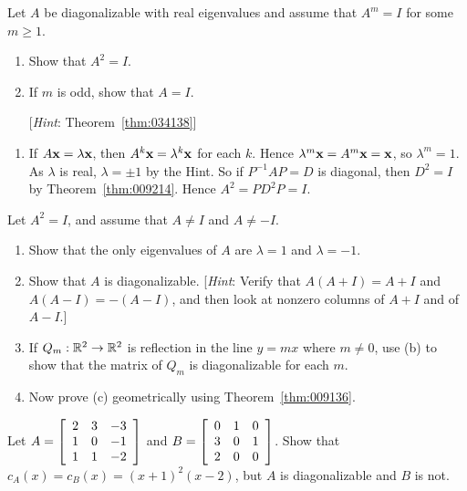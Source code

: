 \begin{multicols}{2}
\begin{ex}
Let $A$ be diagonalizable with real eigenvalues and assume that $A^{m} = I$ for some $m \geq 1$.


\begin{enumerate}[label={\alph*.}]
\item Show that $A^{2} = I$.

\item If $m$ is odd, show that $A = I$.


[\textit{Hint}: Theorem~\ref{thm:034138}]

\end{enumerate}
\begin{sol}
\begin{enumerate}[label={\alph*.}]
\item  If $A\textbf{x} = \lambda\textbf{x}$, then $A^{k}\textbf{x} = \lambda^{k}\textbf{x}$ for each $k$. Hence $\lambda^{m}\textbf{x} = A^{m}\textbf{x} = \textbf{x}$, so $\lambda^{m} = 1$. As $\lambda$ is real, $\lambda = \pm 1$ by the Hint. So if $P^{-1}AP = D$ is diagonal, then $D^{2} = I$ by Theorem~\ref{thm:009214}. Hence $A^{2} = PD^{2}P = I$.

\end{enumerate}
\end{sol}
\end{ex}

\columnbreak
\begin{ex}
Let $A^{2} = I$, and assume that $A \neq I$ and $A \neq -I$.


\begin{enumerate}[label={\alph*.}]
\item Show that the only eigenvalues of $A$ are $\lambda = 1$ and $\lambda = -1$.

\item Show that $A$ is diagonalizable. [\textit{Hint}: Verify that $A(A + I) = A + I$ and $A(A - I) = -(A - I)$, and then look at nonzero columns of $A + I$ and of $A - I$.]

\item If $Q_{m} : \mathbb{R}^2 \to \mathbb{R}^2$  is reflection in the line $y = mx$ where $m \neq 0$, use (b) to show that the matrix of $Q_{m}$ is diagonalizable for each $m$.

\item Now prove (c) geometrically using Theorem~\ref{thm:009136}.

\end{enumerate}
\end{ex}

\begin{ex}
Let $A = \left[ \begin{array}{rrr}
2 & 3 & -3 \\
1 & 0 & -1 \\
1 & 1 & -2 
\end{array} \right]$
 and $B = \left[ \begin{array}{rrr}
0 & 1 & 0 \\
3 & 0 & 1 \\
2 & 0 & 0  
\end{array} \right]$.
 Show that $c_{A}(x) = c_{B}(x) = (x + 1)^{2} (x - 2)$, but $A$ is diagonalizable and $B$ is not.
\end{ex}


\end{multicols}
